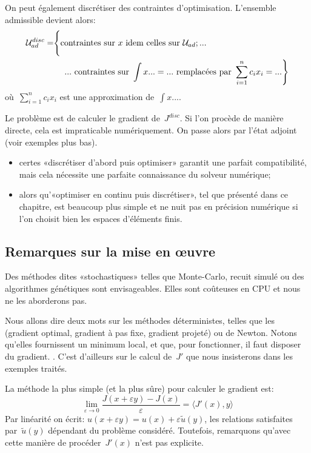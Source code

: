 On peut également discrétiser des contraintes d'optimisation. L'ensemble admissible devient alors:
\begin{equation}
\begin{split} 
\mathcal{U}^{disc}_{ad} = &\Bigg\{ \text{contraintes sur } x \text{ idem celles sur } \mathcal{U}_{ad}; ...\\  
& \left. \quad ... \text{ contraintes sur } \int x...=... \text{ remplacées par } \displaystyle\sum_{i=1}^n c_ix_i = ... \right\}
\end{split}
\end{equation}
où~$\sum_{i=1}^n c_ix_i$ est une approximation de~$\int x...$.

Le problème est de calculer le gradient de~$J^{disc}$. Si l'on procède de manière directe, cela est impraticable numériquement. On passe alors par l'état adjoint (voir exemples plus bas).

\medskip
{}
\begin{itemize}
   \item certes «discrétiser d'abord puis optimiser» garantit une parfait compatibilité, mais cela nécessite une parfaite connaissance du solveur numérique;
   \item alors qu'«optimiser en continu puis discrétiser», tel que présenté dans ce chapitre, est beaucoup plus simple et ne nuit pas en précision numérique si l'on choisit bien les espaces d'éléments finis.
\end{itemize}


\medskip
\subsection{Remarques sur la mise en œuvre}

Des méthodes dites «stochastiques» telles que Monte-Carlo, recuit simulé ou des algorithmes génétiques sont envisageables. Elles sont coûteuses en CPU et nous ne les aborderons pas.

Nous allons dire deux mots sur les méthodes déterministes, telles que les  (gradient optimal, gradient à pas fixe, gradient projeté) ou de Newton. Notons qu'elles fournissent un minimum local, et que, pour fonctionner, il faut disposer du gradient. . C'est d'ailleurs sur le calcul de~$J'$ que nous insisterons dans les exemples traités.

\medskip
La méthode la plus simple (et la plus sûre) pour calculer le gradient est:
\begin{equation}
\lim_{\varepsilon\rightarrow0} \dfrac{J(x+\varepsilon y)-J(x)}{\varepsilon}
=\langle J'(x),y\rangle %
\end{equation}
Par linéarité on écrit: $u(x+\varepsilon y)=u(x)+\varepsilon \tilde{u}(y)$, les relations satisfaites par~$\tilde{u}(y)$ dépendant du problème considéré.
Toutefois, remarquons qu'avec cette manière de procéder~$J'(x)$ n'est pas explicite.

